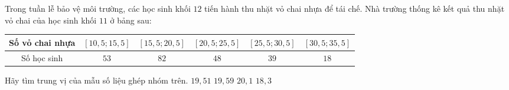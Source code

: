  \begin{ex}%
 	Trong tuần lễ bảo vệ môi trường, các học sinh khối $12$ tiến hành thu nhặt vỏ chai nhựa để tái chế. Nhà trường thống kê kết quả thu nhặt vỏ chai của học sinh khối $11$ ở bảng sau:
 \begin{center}
 		\begin{tabular}{|c|c|c|c|c|c|}
 		\hline Số vỏ chai nhựa & $[10{,}5;15{,}5]$ & $[15{,}5;20{,}5]$ & $[20{,}5;25{,}5]$ & $[25{,}5;30{,}5]$ & $[30{,}5;35{,}5]$ \\
 		\hline Số học sinh & $53$ & $82$ & $48$ & $39$ & $18$ \\
 		\hline
 	\end{tabular}
 \end{center}
 	Hãy tìm trung vị của mẫu số liệu ghép nhóm trên.
 	\choice
 	{$19{,}51$}
 	{\True $19{,}59$}
 	{$20{,}1$}
 	{$18{,}3$}
 \end{ex}
